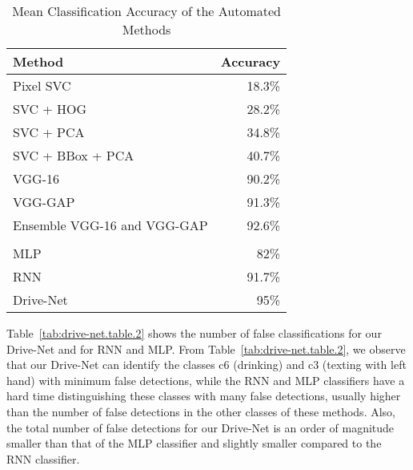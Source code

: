 \documentclass[conference,compsoc]{IEEEtran}
\begin{document}
\begin{table}[htbp]
\centering
\caption{Mean Classification Accuracy of the Automated Methods}%
\label{tab:drive-net.table.1}
\begin{tabular}{@{}lr@{}}
\toprule
\textbf{Method}             & \textbf{Accuracy} \\ \midrule
Pixel SVC                   & 18.3\%            \\
SVC + HOG                   & 28.2\%            \\
SVC + PCA                   & 34.8\%            \\
SVC + BBox + PCA            & 40.7\%            \\
VGG-16                      & 90.2\%            \\
VGG-GAP                     & 91.3\%            \\
Ensemble VGG-16 and VGG-GAP & 92.6\%            \\
\multicolumn{2}{l}{\cellcolor[HTML]{C0C0C0}}    \\
MLP                         & 82\%              \\
RNN                         & 91.7\%            \\
Drive-Net                   & 95\%              \\ \bottomrule
\end{tabular}
\end{table}

Table~\ref{tab:drive-net.table.2} shows the number of false classifications for our Drive-Net and for RNN and MLP\@. From Table~\ref{tab:drive-net.table.2}, we observe that our Drive-Net can identify the classes c6 (drinking) and c3 (texting with left hand) with minimum false detections, while the RNN and MLP classifiers have a hard time distinguishing these classes with many false detections, usually higher than the number of false detections in the other classes of these methods. Also, the total number of false detections for our Drive-Net is an order of magnitude smaller than that of the MLP classifier and slightly smaller compared to the RNN classifier.
\end{document}
